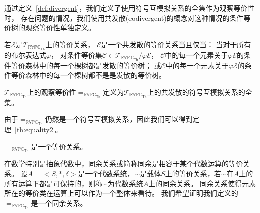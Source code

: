 通过定义~\ref{def:divergent}，我们定义了使用符号互模拟关系的全集作为观察等价性时，
存在问题的情况，我们使用共发散(codivergent)的概念对这种情况的条件等价树的观察等价性单独定义。

\begin{definition}
   若$\mathcal{E}$是$\mathcal{T}_{\mathbb{RVPC}_{\mathsf{Th}}}$上的等价关系，
   $\mathcal{E}$是一个共发散的等价关系当且仅当：
   当对于所有的布尔表达式$\varphi$，
   对条件等价集$\mathcal{C}\in\mathcal{T}_{\mathbb{RVPC}_{\mathsf{Th}}}/\varphi\mathcal{E}$，
   $\mathcal{C}$中的每一个元素关于$\varphi\mathcal{E}$的条件等价森林中的每一个棵树都是发散的等价树；
   或$\mathcal{C}$中的每一个元素关于$\varphi\mathcal{E}$的条件等价森林中的每一个棵树都不是是发散的等价树。
\end{definition}

\begin{definition}
   $\mathcal{T}_{\mathbb{RVPC}_{\mathsf{Th}}}$上的观察等价性$=_{\mathbb{RVPC}_{\mathsf{Th}}}$定义为$\mathcal{T}_{\mathbb{RVPC}_{\mathsf{Th}}}$上的共发散的符号互模拟关系的全集。
\end{definition}
由于$=_{\mathbb{RVPC}_{\mathsf{Th}}}$仍然是一个符号互模拟关系，因此我们可以得到定理~\ref{th:equality2}。
\begin{theorem}\label{th:equality2}
   $=_{\mathbb{RVPC}_{\mathsf{Th}}}$是一个等价关系。
\end{theorem}

在数学特别是抽象代数中，同余关系或简称同余是相容于某个代数运算的等价关系。
设$A=<S,*,\delta>$是一个代数系统，$\sim$是载体$S$上的等价关系，若$\sim$在$A$上的所有运算下都是可保持的，则称$\sim$为代数系统$A$上的同余关系\cite{Cougruence}。 
同余关系使得元素所在的等价类在运算上可以作为一个整体来看待。
我们希望证明我们定义的$=_{\mathbb{RVPC}_{\mathsf{Th}}}$是一个同余关系。

